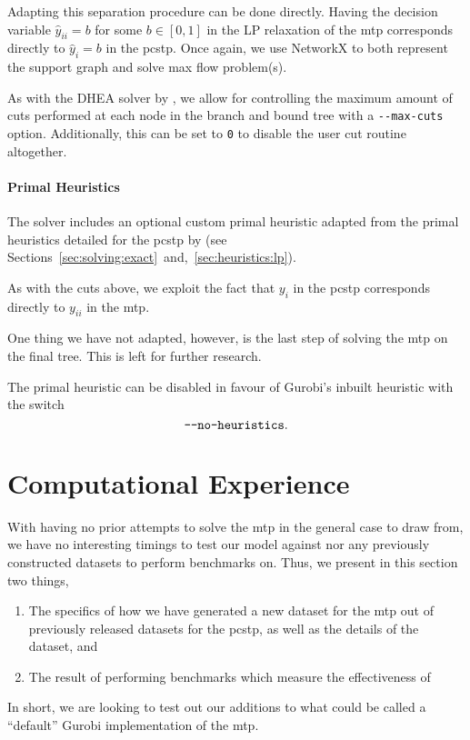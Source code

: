 Adapting this separation procedure can be done directly. Having the decision variable
$\hat y_{ii} = b$ for some $b \in [0,1]$ in the LP relaxation of
the \gls{mtp} corresponds directly to $\hat y_i = b$ in the \gls{pcstp}.
Once again, we use NetworkX to both represent the support graph and solve max flow problem(s).

As with the DHEA solver by \citet{ljubic2005solving}, we allow for controlling the maximum amount
of cuts performed at each node in the branch and bound tree
with a \texttt{-{}-max-cuts} option. Additionally, this can be set
to \texttt{0} to disable the user cut routine altogether.

\paragraph{Primal Heuristics}
The solver includes an optional custom primal heuristic adapted from the primal heuristics detailed
for the \gls{pcstp} by \citet{ljubic2005solving}
(see Sections~\ref{sec:solving:exact}~and,~\ref{sec:heuristics:lp}).

As with the cuts above, we exploit the fact that $y_i$ in the \gls{pcstp}
corresponds directly to $y_{ii}$ in the \gls{mtp}.

One thing we have not adapted, however, is the last step of solving the \gls{mtp}
on the final tree. This is left for further research.

The primal heuristic can be disabled in favour of Gurobi's inbuilt heuristic with
the switch \[\texttt{-{}-no-heuristics}\mathnormal{.}\]
\section{Computational Experience}
With having no prior attempts to solve the \gls{mtp} in the general case to draw from,
we have no interesting timings to test our model against nor any previously constructed
datasets to perform benchmarks on. Thus, we present in this section two things,
\begin{enumerate}
\item The specifics of how we have generated a new dataset for the \gls{mtp} out of previously released
  datasets for the \gls{pcstp},
  as well as the details of the dataset, and
\item The result of performing benchmarks which measure the effectiveness of
\end{enumerate}
In short, we are looking to test out our additions to what could be called a ``default'' Gurobi
implementation of the \gls{mtp}.

